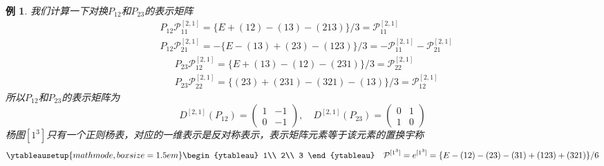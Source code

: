 \documentclass[12pt]{article}
\newtheorem{example}{例}[subsection]
\begin{document}
\begin{example}
我们计算一下对换$P_{12}$和$P_{23}$的表示矩阵
\begin{equation*}
    \begin{split}
        &P_{12}\mathcal{P}_{11}^{[2,1]}=\{E+(12)-(13)-(213)\}/3=\mathcal{P}_{11}^{[2,1]}\\
        &P_{12}\mathcal{P}_{21}^{[2,1]}=-\{E-(13)+(23)-(123)\}/3=-\mathcal{P}_{11}^{[2,1]}-\mathcal{P}_{21}^{[2,1]}
    \end{split}
\end{equation*}
\begin{equation*}
    \begin{split}
        &P_{23}\mathcal{P}_{12}^{[2,1]}=\{E+(13)-(12)-(231)\}/3=\mathcal{P}_{22}^{[2,1]}\\
        &P_{23}\mathcal{P}_{22}^{[2,1]}=\{(23)+(231)-(321)-(13)\}/3=\mathcal{P}_{12}^{[2,1]}
    \end{split}
\end{equation*}
所以$P_{12}$和$P_{23}$的表示矩阵为
\begin{equation*}
    D^{[2,1]}(P_{12})=\begin{pmatrix}
        1&-1\\
        0&-1
    \end{pmatrix},\quad D^{[2,1]}(P_{23})=\begin{pmatrix}
        0&1\\
        1&0
    \end{pmatrix}
\end{equation*}
杨图$[1^3]$只有一个正则杨表，对应的一维表示是反对称表示，表示矩阵元素等于该元素的置换宇称
\begin{equation*}
\ytableausetup{mathmode,boxsize=1.5em}
\begin{ytableau}
    1\\
    2\\
    3
\end{ytableau}\quad \mathcal{P}^{[1^3]}=e^{[1^3]}=\{E-(12)-(23)-(31)+(123)+(321)\}/6
\end{equation*}
\end{example}
\end{document}
